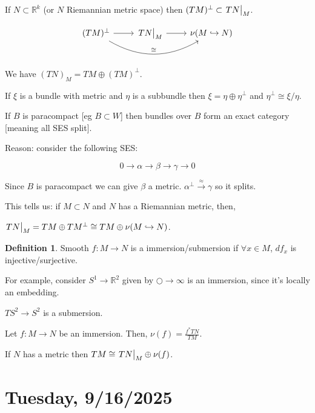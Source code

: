 \documentclass{article}
\theoremstyle{definition}
\newtheorem*{definition}{Definition}
\begin{document}
\begin{enumerate}[label=\alph*)]
        If \(N \subset \mathbb{R}^k\) (or \(N\) Riemannian metric space) then \((TM)^\perp \subset \eval{TN}_{M}\).

        \[
            \begin{tikzcd}
                (TM)^\perp \ar[rr, bend right, "\cong"] \ar[r] & \eval{TN}_{M}^{} \ar[r] & \nu(M \hookrightarrow N) 
            \end{tikzcd}
        \]

        We have \((TN)_M = TM \oplus (TM)^\perp\).

        If \(\xi\) is a bundle with metric and \(\eta\) is a subbundle then \(\xi = \eta \oplus \eta^\perp\) and \(\eta^\perp \cong  \xi / \eta\).

    \end{enumerate}

    If \(B\) is paracompact [eg \(B \subset W\)] then bundles over \(B\) form an exact category [meaning all SES split].
    
    Reason: consider the following SES:

    \[
        0 \to \alpha  \to \beta \to \gamma \to 0
    \]

    Since \(B\) is paracompact we can give \(\beta\) a metric. \(\alpha^ \perp \xrightarrow{\approx} \gamma\) so it splits.
    
    This tells us: if \(M \subset N\) and \(N\) has a Riemannian metric, then,
    
    \(\eval{TN}_{M}^{} = TM \oplus TM^ \perp \cong TM \oplus \nu(M \hookrightarrow N)\).

    \begin{definition}
        Smooth \(f: M \to N\) is a immersion/submersion if \(\forall x\in M\), \(df_x\) is injective/surjective.
    \end{definition}

    For example, consider \(S^1 \to \mathbb{R}^2\) given by \(\bigcirc \to \infty\) is an immersion, since it's locally an embedding.

    \(TS^2 \to S^2\) is a submersion.

    Let \(f: M\to N\) be an immersion. Then, \(\nu(f) = \frac{f^{\ast} TN}{TM}\).

    If \(N\) has a metric then \(TM \cong \eval{TN}_{M}^{} \oplus \nu (f)\).

    \section*{Tuesday, 9/16/2025}
\end{document}
